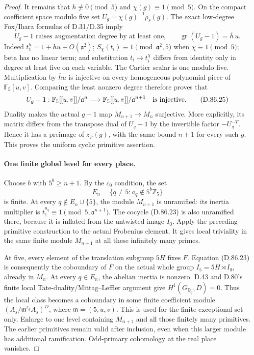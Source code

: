 \begin{proof}
It remains that \(h\not\equiv0\pmod5\) and
\(\chi(g)\equiv1\pmod5\). On the compact coefficient
space modulo five set
\(U_g=\chi(g)^{-1}\rho_s(g)\). The exact low-degree
Fox/Ihara formulas of D.31/D.35 imply
\[
 U_g-1\text{ raises augmentation degree by at least one,}
 \qquad \operatorname{gr}(U_g-1)=\overline h\,u.
                                                               \tag{D.86.24}
\]
Indeed \(t_1^h=1+\overline h u+O(\mathfrak a^2)\);
\(S_\chi(t_i)\equiv1\pmod{\mathfrak a^2,5}\) when
\(\chi\equiv1\pmod5\); beta has no linear term;
and substitution \(t_i\mapsto t_i^\chi\) differs from
identity only in degree at least five on each variable.
The Cartier scalar is one modulo five. Multiplication by
\(\overline h u\) is injective on every homogeneous
polynomial piece of \(\mathbb F_5[u,v]\). Comparing the
least nonzero degree therefore proves that
\[
 U_g-1:\mathbb F_5[[u,v]]/\mathfrak a^n
          \longrightarrow
          \mathbb F_5[[u,v]]/\mathfrak a^{n+1}
                    \quad\hbox{is injective}.          \tag{D.86.25}
\]
Duality makes the actual \(g-1\) map
\(M_{n+1}\to M_n\) surjective. More explicitly, its
matrix differs from the transpose dual of \(U_g-1\)
by the invertible factor \(-U_g^{-T}\). Hence it has
a preimage of \(z_\varphi(g)\), with the same bound
\(n+1\) for every such \(g\). This proves the uniform
cyclic primitive assertion.

\paragraph{One finite global level for every place.}
Choose \(b\) with \(5^b\ge n+1\). By the \(c_0\)
condition, the set
\[
          E_n=\{q\ne5:a_q\notin5^b\mathbb Z_5\}
                                                               \tag{D.86.26}
\]
is finite. At every \(q\notin E_n\cup\{5\}\), the
module \(M_{n+1}\) is unramified: its inertia multiplier
is \(t_1^{a_q}\equiv1\pmod{5,\mathfrak a^{n+1}}\).
The cocycle (D.86.23) is also unramified there, because
it is inflated from the untwisted image \(I_0\).
Apply the preceding primitive construction to the actual
Frobenius element. It gives local triviality in the same
finite module \(M_{n+1}\) at all these infinitely many
primes.

At five, every element of the translation subgroup \(5H\)
fixes \(F\). Equation (D.86.23) is consequently the
coboundary of \(F\) on the actual whole group
\(I_5=5H\rtimes I_0\), already in \(M_n\).
At every \(q\in E_n\), the abelian inertia is nonzero.
D.43 and D.80's finite local Tate-duality/Mittag--Leffler
argument give
\(H^1(G_{\mathbb Q_q},D)=0\). Thus the local class
becomes a coboundary in some finite coefficient module
\((A_s/\mathfrak m^{r_q}A_s)^D\), where
\(\mathfrak m=(5,u,v)\). This is used for the finite
exceptional set only. Enlarge to one level containing
\(M_{n+1}\) and all those finitely many primitives.
The earlier primitives remain valid after inclusion, even
when this larger module has additional ramification.
Odd-primary cohomology at the real place vanishes.


\end{proof}
